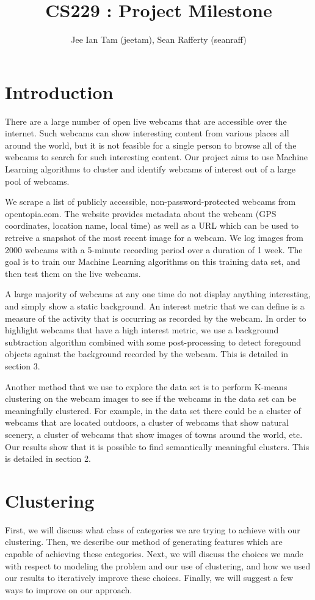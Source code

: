 \documentclass{article}
\begin{document}
\title{CS229 : Project Milestone}
\author{Jee Ian Tam (jeetam), Sean Rafferty (seanraff)}

\section{Introduction}
There are a large number of open live webcams that are accessible over the
internet. Such webcams can show interesting content from various places all
around the world, but it is not feasible for a single person to browse all of
the webcams to search for such interesting content. Our project aims to use
Machine Learning algorithms to cluster and identify webcams of interest out of
a large pool of webcams.

We scrape a list of publicly accessible, non-password-protected webcams from
opentopia.com. The website provides metadata about the webcam (GPS coordinates,
location name, local time) as well as a URL which can be used to retreive a
snapshot of the most recent image for a webcam. We log images from 2000 webcams
with a 5-minute recording period over a duration of 1 week. The goal is to
train our Machine Learning algorithms on this training data set, and then test
them on the live webcams.

A large majority of webcams at any one time do not display anything
interesting, and simply show a static background. An interest metric that we
can define is a measure of the activity that is occurring as recorded by the
webcam. In order to highlight webcams that have a high interest metric, we use
a background subtraction algorithm combined with some post-processing to detect
foregound objects against the background recorded by the webcam. This is
detailed in section 3.

Another method that we use to explore the data set is to perform K-means
clustering on the webcam images to see if the webcams in the data set can be
meaningfully clustered. For example, in the data set there could be a cluster
of webcams that are located outdoors, a cluster of webcams that show natural
scenery, a cluster of webcams that show images of towns around the world, etc. Our
results show that it is possible to find semantically meaningful clusters. This
is detailed in section 2.

\section{Clustering}
First, we will discuss what class of categories we are trying to achieve with
our clustering. Then, we describe our method of generating features which are
capable of achieving these categories. Next, we will discuss the choices we
made with respect to modeling the problem and our use of clustering, and how we
used our results to iteratively improve these choices. Finally, we will suggest
a few ways to improve on our approach.
\end{document}
